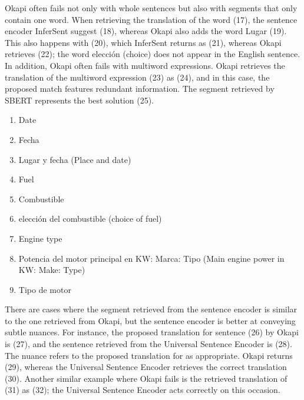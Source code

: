 Okapi often fails not only with whole sentences but also with segments that only contain one word. When retrieving the translation of the word (17), the sentence encoder InferSent suggest (18), whereas Okapi also adds the word Lugar (19). This also happens with (20), which InferSent returns as (21), whereas Okapi retrieves (22); the word elección (choice) does not appear in the English sentence. In addition, Okapi often fails with multiword expressions. Okapi retrieves the translation of the multiword expression (23) as (24), and in this case, the proposed match features redundant information. The segment retrieved by SBERT represents the best solution (25).

\begin{enumerate}[resume,label={(\arabic*)}]
		\item	Date
		\item	Fecha
		\item	Lugar y fecha (Place and date)
		\item	Fuel
		\item	Combustible
		\item	elección del combustible (choice of fuel)
		\item	Engine type
		\item	Potencia del motor principal en KW: Marca: Tipo (Main engine power in KW: Make: Type)
		\item	Tipo de motor
	
\end{enumerate}

There are cases where the segment retrieved from the sentence encoder is similar to the one retrieved from Okapi, but the sentence encoder is better at conveying subtle nuances. For instance, the proposed translation for sentence (26) by Okapi is (27), and the sentence retrieved from the Universal Sentence Encoder is (28). The nuance refers to the proposed translation for as appropriate. Okapi returns (29), whereas the Universal Sentence Encoder retrieves the correct translation (30). Another similar example where Okapi fails is the retrieved translation of (31) as (32); the Universal Sentence Encoder acts correctly on this occasion.

